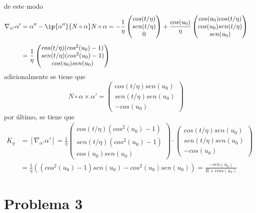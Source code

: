 \documentclass{article}
\begin{document}
de este modo
\begin{align*}
    \nabla_{\alpha'}\alpha' &= \alpha''-\ip{\alpha''}{N\circ\alpha}N\circ\alpha
    =-\frac{1}{\eta}\begin{pmatrix}
        cos(t/\eta) \\ sen(t/\eta) \\ 0
    \end{pmatrix}+\frac{cos(u_{0})}{\eta}\begin{pmatrix}
        cos(u_{0})cos(t/\eta) \\ cos(u_{0})sen(t/\eta) \\ sen(u_{0})
    \end{pmatrix} \\[2mm]
    &= \frac{1}{\eta}\begin{pmatrix}
        cos(t/\eta)(cos^{2}(u_{0})-1) \\ sen(t/\eta)(cos^{2}(u_{0})-1) \\ cos(u_{0})sen(u_{0})
    \end{pmatrix}
\end{align*}
adicionalmente se tiene que
\begin{equation*}
    N\circ\alpha\times\alpha'=\begin{pmatrix}
        cos(t/\eta)sen(u_{0}) \\ sen(t/\eta)sen(u_{0}) \\ -cos(u_{0})
    \end{pmatrix}
\end{equation*}
por último, se tiene que
\begin{align*}
    K_{g} &= [\nabla_{\alpha'}\alpha']=\frac{1}{\eta}\begin{pmatrix}
        cos(t/\eta)(cos^{2}(u_{0})-1) \\ sen(t/\eta)(cos^{2}(u_{0})-1) \\ cos(u_{0})sen(u_{0})
    \end{pmatrix}\cdot\begin{pmatrix}
        cos(t/\eta)sen(u_{0}) \\ sen(t/\eta)sen(u_{0}) \\ -cos(u_{0})
    \end{pmatrix} \\[2mm]
    &= \frac{1}{\eta}\left((cos^{2}(u_{0})-1)sen(u_{0})-cos^{2}(u_{0})sen(u_{0})\right)
    =\frac{-sen(u_{0})}{R+rcos(u_{0})}
\end{align*}

\section*{Problema 3}
\end{document}
